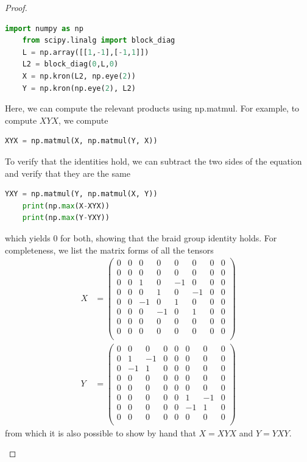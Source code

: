 \begin{proof}
\begin{parts}
		\begin{lstlisting}[language=Python]
	import numpy as np
	from scipy.linalg import block_diag
	L = np.array([[1,-1],[-1,1]])
	L2 = block_diag(0,L,0)
	X = np.kron(L2, np.eye(2))
	Y = np.kron(np.eye(2), L2)	\end{lstlisting}
	Here, we can compute the relevant products using np.matmul. For example, to compute $XYX$, we compute
	\begin{lstlisting}[language=Python]
	XYX = np.matmul(X, np.matmul(Y, X))\end{lstlisting}
To verify that the identities hold, we can subtract the two sides of the equation and verify that they are the same
\begin{lstlisting}[language=Python]
	YXY = np.matmul(Y, np.matmul(X, Y))
	print(np.max(X-XYX))
	print(np.max(Y-YXY))\end{lstlisting}
which yields $0$ for both, showing that the braid group identity holds. For completeness, we list the matrix forms of all the tensors
\begin{align*}
	X &= \left(
	\begin{array}{cccccccc}
		0 & 0 & 0 & 0 & 0 & 0 & 0 & 0 \\
		0 & 0 & 0 & 0 & 0 & 0 & 0 & 0 \\
		0 & 0 & 1 & 0 & -1 & 0 & 0 & 0 \\
		0 & 0 & 0 & 1 & 0 & -1 & 0 & 0 \\
		0 & 0 & -1 & 0 & 1 & 0 & 0 & 0 \\
		0 & 0 & 0 & -1 & 0 & 1 & 0 & 0 \\
		0 & 0 & 0 & 0 & 0 & 0 & 0 & 0 \\
		0 & 0 & 0 & 0 & 0 & 0 & 0 & 0 \\
	\end{array}
	\right) \\
	Y &= \left(
	\begin{array}{cccccccc}
		0 & 0 & 0 & 0 & 0 & 0 & 0 & 0 \\
		0 & 1 & -1 & 0 & 0 & 0 & 0 & 0 \\
		0 & -1 & 1 & 0 & 0 & 0 & 0 & 0 \\
		0 & 0 & 0 & 0 & 0 & 0 & 0 & 0 \\
		0 & 0 & 0 & 0 & 0 & 0 & 0 & 0 \\
		0 & 0 & 0 & 0 & 0 & 1 & -1 & 0 \\
		0 & 0 & 0 & 0 & 0 & -1 & 1 & 0 \\
		0 & 0 & 0 & 0 & 0 & 0 & 0 & 0 \\
	\end{array}
	\right)
\end{align*}
from which it is also possible to show by hand that $X=XYX$ and $Y=YXY$.
		

\end{parts}
\end{proof}
